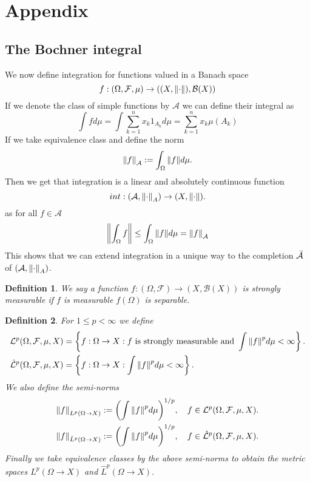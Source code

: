 \documentclass[12pt]{article}
\newtheorem{definition}{Definition}
\begin{document}
\section{Appendix}
\subsection{The Bochner integral}
We now define integration for functions valued in a Banach space \begin{equation*}
    f:(\Omega,\mathcal{F},\mu)\to ((X,\norm{\cdot}),\mathcal{B}(X))
\end{equation*}
If we denote the class of simple functions by $\mathcal{A}$ we can define their integral as
\begin{equation*}
    \int f d\mu=\int \sum_{k=1}^n x_k 1_{A_k} d\mu=\sum_{k=1}^n x_k\mu({A_k})
\end{equation*}
If we take equivalence class and define the norm
\begin{equation*}
    \norm{f}_\mathcal{A}:=\int_\Omega \norm{f} d\mu.
\end{equation*}
Then we get that integration is a linear and absolutely continuous function
\begin{equation*}
    int: \qty(\mathcal{A},\norm{\cdot}_A)\to (X,\norm{\cdot}).
\end{equation*}
as for all $f\in\mathcal{A}$
\begin{equation*}
    \norm{\int_\Omega f}\leq\int_\Omega \norm{f} d\mu=\norm{f}_\mathcal{A}
\end{equation*}
This shows that we can extend integration in a unique way to the completion $\Bar{\mathcal{A}}$ of $\qty(\mathcal{A},\norm{\cdot}_A)$.
\begin{definition}
    We say a function $f:(\Omega,\mathcal{F})\to (X,\mathcal{B}(X))$ is strongly measurable if $f$ is measurable $f(\Omega)$ is separable.
\end{definition}
\begin{definition}
    For $1\leq p<\infty$ we define
    \begin{align*}
        \mathcal{L}^p(\Omega,\mathcal{F},\mu,X)       & =\left\{f:\Omega\to X: f \text{ is strongly measurable and } \int \norm{f}^p d\mu<\infty\right\}. \\
        \hat{\mathcal{L}}^p(\Omega,\mathcal{F},\mu,X) & =\left\{f:\Omega\to X: \int \norm{f}^p d\mu<\infty\right\}.
    \end{align*}
    We also define the semi-norms
    \begin{align*}
        \norm{f}_{L^p(\Omega\to X)}       & :=\qty(\int \norm{f}^p d\mu)^{1/p},\quad f\in\mathcal{L}^p(\Omega,\mathcal{F},\mu,X).       \\
        \norm{f}_{\hat{L}^p(\Omega\to X)} & :=\qty(\int \norm{f}^p d\mu)^{1/p},\quad f\in\hat{\mathcal{L}}^p(\Omega,\mathcal{F},\mu,X).
    \end{align*}
    Finally we take equivalence classes by the above semi-norms to obtain the metric spaces $L^p(\Omega\to X)$ and $\hat{L}^p(\Omega\to X).$
\end{definition}
\end{document}
